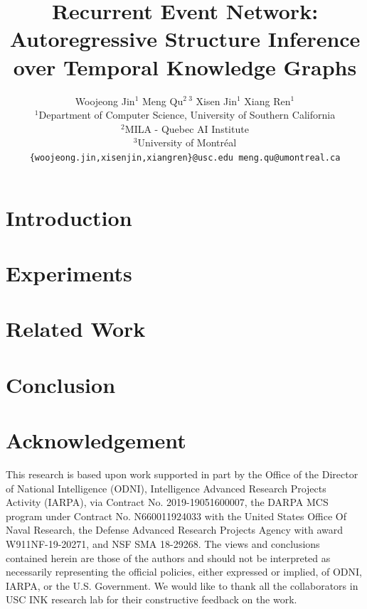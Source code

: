 \documentclass[11pt,a4paper]{article}
\title{Recurrent Event Network: Autoregressive Structure Inference over Temporal Knowledge Graphs}
\author{Woojeong Jin$^1$ \quad Meng Qu$^2\, ^3$ \quad Xisen Jin$^1$ \quad Xiang Ren$^1$ \\
$^1$Department of Computer Science, University of Southern California\\
$^2$MILA - Quebec AI Institute \\
$^3$University of Montr\'{e}al\\
\texttt{\{woojeong.jin,xisenjin,xiangren\}@usc.edu meng.qu@umontreal.ca} \\
}
\date{}
\begin{document}
\maketitle
\begin{abstract}

\end{abstract}


\section{Introduction}




\section{Experiments}


\section{Related Work}


\section{Conclusion}


\section*{Acknowledgement}
This research is based upon work supported in part by the Office of the Director of National Intelligence (ODNI), Intelligence Advanced Research Projects Activity (IARPA), via Contract No. 2019-19051600007, the DARPA MCS program under Contract No. N660011924033 with the United States Office Of Naval Research, the Defense Advanced Research Projects Agency with award W911NF-19-20271, and NSF SMA 18-29268. The views and conclusions contained herein are those of the authors and should not be interpreted as necessarily representing the official policies, either expressed or implied, of ODNI, IARPA, or the U.S. Government. We would like to thank all the collaborators in USC INK research lab for their constructive feedback on the work.





\clearpage
\appendix



\end{document}
